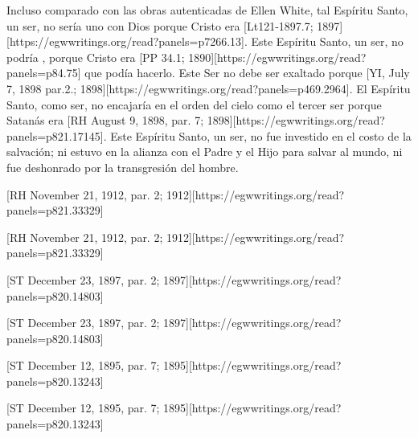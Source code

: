 Incluso comparado con las obras autenticadas de Ellen White, tal Espíritu Santo, un ser, no sería uno con Dios porque Cristo era [Lt121-1897.7; 1897][https://egwwritings.org/read?panels=p7266.13]. Este Espíritu Santo, un ser, no podría , porque Cristo era [PP 34.1; 1890][https://egwwritings.org/read?panels=p84.75] que podía hacerlo. Este Ser no debe ser exaltado porque [YI, July 7, 1898 par.2.; 1898][https://egwwritings.org/read?panels=p469.2964]. El Espíritu Santo, como ser, no encajaría en el orden del cielo como el tercer ser porque Satanás era [RH August 9, 1898, par. 7; 1898][https://egwwritings.org/read?panels=p821.17145]. Este Espíritu Santo, un ser, no fue investido en el costo de la salvación; ni estuvo en la alianza con el Padre y el Hijo para salvar al mundo, ni fue deshonrado por la transgresión del hombre.


[RH November 21, 1912, par. 2; 1912][https://egwwritings.org/read?panels=p821.33329]


[RH November 21, 1912, par. 2; 1912][https://egwwritings.org/read?panels=p821.33329]


[ST December 23, 1897, par. 2; 1897][https://egwwritings.org/read?panels=p820.14803]


[ST December 23, 1897, par. 2; 1897][https://egwwritings.org/read?panels=p820.14803]


[ST December 12, 1895, par. 7; 1895][https://egwwritings.org/read?panels=p820.13243]


[ST December 12, 1895, par. 7; 1895][https://egwwritings.org/read?panels=p820.13243]


